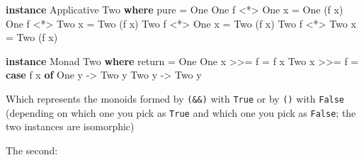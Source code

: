 \documentclass[]{article}
\newenvironment{Shaded}{}{}
\newcommand{\DataTypeTok}[1]{\textcolor[rgb]{0.56,0.13,0.00}{#1}}
\newcommand{\FunctionTok}[1]{\textcolor[rgb]{0.02,0.16,0.49}{#1}}
\newcommand{\KeywordTok}[1]{\textcolor[rgb]{0.00,0.44,0.13}{\textbf{#1}}}
\newcommand{\NormalTok}[1]{#1}
\newcommand{\OperatorTok}[1]{\textcolor[rgb]{0.40,0.40,0.40}{#1}}
\newcommand{\OtherTok}[1]{\textcolor[rgb]{0.00,0.44,0.13}{#1}}
\begin{document}
\begin{Shaded}
\begin{Highlighting}[]
\KeywordTok{instance} \DataTypeTok{Applicative} \DataTypeTok{Two} \KeywordTok{where}
    \FunctionTok{pure} \OtherTok{=} \DataTypeTok{One}
    \DataTypeTok{One}\NormalTok{ f }\OperatorTok{\textless{}*\textgreater{}} \DataTypeTok{One}\NormalTok{ x }\OtherTok{=} \DataTypeTok{One}\NormalTok{ (f x)}
    \DataTypeTok{One}\NormalTok{ f }\OperatorTok{\textless{}*\textgreater{}} \DataTypeTok{Two}\NormalTok{ x }\OtherTok{=} \DataTypeTok{Two}\NormalTok{ (f x)}
    \DataTypeTok{Two}\NormalTok{ f }\OperatorTok{\textless{}*\textgreater{}} \DataTypeTok{One}\NormalTok{ x }\OtherTok{=} \DataTypeTok{Two}\NormalTok{ (f x)}
    \DataTypeTok{Two}\NormalTok{ f }\OperatorTok{\textless{}*\textgreater{}} \DataTypeTok{Two}\NormalTok{ x }\OtherTok{=} \DataTypeTok{Two}\NormalTok{ (f x)}

\KeywordTok{instance} \DataTypeTok{Monad} \DataTypeTok{Two} \KeywordTok{where}
    \FunctionTok{return} \OtherTok{=} \DataTypeTok{One}
    \DataTypeTok{One}\NormalTok{ x }\OperatorTok{\textgreater{}\textgreater{}=}\NormalTok{ f }\OtherTok{=}\NormalTok{ f x}
    \DataTypeTok{Two}\NormalTok{ x }\OperatorTok{\textgreater{}\textgreater{}=}\NormalTok{ f }\OtherTok{=} \KeywordTok{case}\NormalTok{ f x }\KeywordTok{of}
                    \DataTypeTok{One}\NormalTok{ y }\OtherTok{{-}\textgreater{}} \DataTypeTok{Two}\NormalTok{ y}
                    \DataTypeTok{Two}\NormalTok{ y }\OtherTok{{-}\textgreater{}} \DataTypeTok{Two}\NormalTok{ y}
\end{Highlighting}
\end{Shaded}

Which represents the monoids formed by \texttt{(\&\&)} with \texttt{True} or by
\texttt{(\textbar{}\textbar{})} with \texttt{False} (depending on which one you
pick as \texttt{True} and which one you pick as \texttt{False}; the two
instances are isomorphic)

The second:
\end{document}
